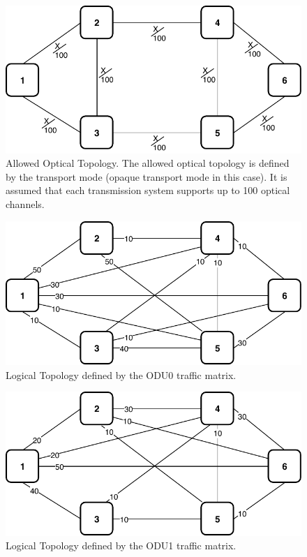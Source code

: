 \begin{figure}[h!]
\centering
\includegraphics[width=13cm]{sdf/ilp/opaque_protection/figures/allowed_optical_topology}
\caption{Allowed Optical Topology. The allowed optical topology is defined by the transport mode (opaque transport mode in this case). It is assumed that each transmission system supports up to 100 optical channels.}
\label{allowed_optical_protectionmedium}
\end{figure}

\newpage
\begin{figure}[h!]
\centering
\includegraphics[width=12cm]{sdf/ilp/opaque_protection/figures/logical_topology_ODU0_medium}
\caption{Logical Topology defined by the ODU0 traffic matrix.}
\label{logical_ODU0_protectionmedium}
\end{figure}

\begin{figure}[h!]
\centering
\includegraphics[width=12cm]{sdf/ilp/opaque_protection/figures/logical_topology_ODU1_medium}
\caption{Logical Topology defined by the ODU1 traffic matrix.}
\label{logical_ODU1_protectionmedium}
\end{figure}

